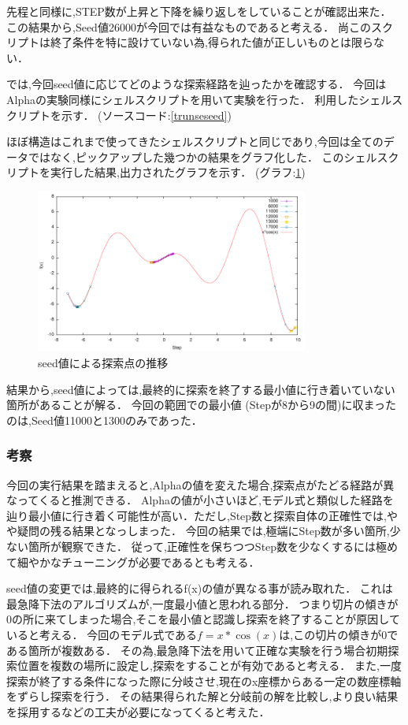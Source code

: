 先程と同様に,STEP数が上昇と下降を繰り返しをしていることが確認出来た．
この結果から,Seed値26000が今回では有益なものであると考える．
尚このスクリプトは終了条件を特に設けていない為,得られた値が正しいものとは限らない．

では,今回seed値に応じてどのような探索経路を辿ったかを確認する．
今回はAlphaの実験同様にシェルスクリプトを用いて実験を行った．
利用したシェルスクリプトを示す． (ソースコード:\ref{trunseseed})



ほぼ構造はこれまで使ってきたシェルスクリプトと同じであり,今回は全てのデータではなく,ピックアップした幾つかの結果をグラフ化した．
このシェルスクリプトを実行した結果,出力されたグラフを示す． (グラフ:\ref{fig:seedtotal})

\begin{figure}[H]
    \centering
    \includegraphics[width=0.8\textwidth]{figs/level2.3/seed_total.pdf}
    \caption{seed値による探索点の推移}
    \label{fig:seedtotal}
\end{figure}

結果から,seed値によっては,最終的に探索を終了する最小値に行き着いていない箇所があることが解る．
今回の範囲での最小値 (Stepが8から9の間)に収まったのは,Seed値11000と1300のみであった．

\subsubsection{考察}
今回の実行結果を踏まえると,Alphaの値を変えた場合,探索点がたどる経路が異なってくると推測できる．
Alphaの値が小さいほど,モデル式と類似した経路を辿り最小値に行き着く可能性が高い．ただし,Step数と探索自体の正確性では,やや疑問の残る結果となっしまった．
今回の結果では,極端にStep数が多い箇所,少ない箇所が観察できた．
従って,正確性を保ちつつStep数を少なくするには極めて細やかなチューニングが必要であるとも考える．

seed値の変更では,最終的に得られるf(x)の値が異なる事が読み取れた．
これは最急降下法のアルゴリズムが,一度最小値と思われる部分．
つまり切片の傾きが0の所に来てしまった場合,そこを最小値と認識し探索を終了することが原因していると考える．
今回のモデル式である$f=x*\cos(x)$は,この切片の傾きが0である箇所が複数ある．
その為,最急降下法を用いて正確な実験を行う場合初期探索位置を複数の場所に設定し,探索をすることが有効であると考える．
また,一度探索が終了する条件になった際に分岐させ,現在のx座標からある一定の数座標軸をずらし探索を行う．
その結果得られた解と分岐前の解を比較し,より良い結果を採用するなどの工夫が必要になってくると考えた．

